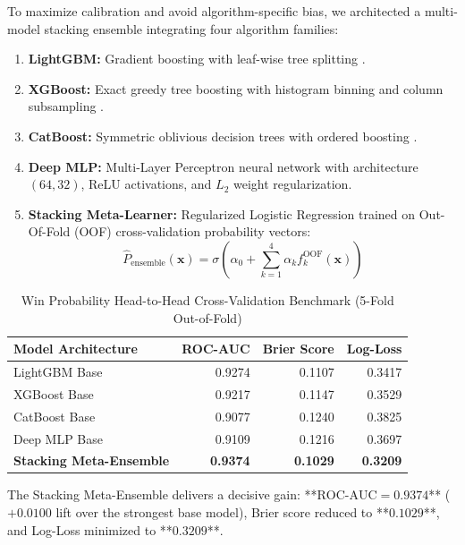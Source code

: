 \documentclass[11pt,a4paper]{article}
\begin{document}
To maximize calibration and avoid algorithm-specific bias, we architected a multi-model stacking ensemble integrating four algorithm families:
\begin{enumerate}[leftmargin=*,itemsep=2pt]
    \item \textbf{LightGBM:} Gradient boosting with leaf-wise tree splitting \cite{ke2017}.
    \item \textbf{XGBoost:} Exact greedy tree boosting with histogram binning and column subsampling \cite{chen2016}.
    \item \textbf{CatBoost:} Symmetric oblivious decision trees with ordered boosting \cite{prokhorenkova2018}.
    \item \textbf{Deep MLP:} Multi-Layer Perceptron neural network with architecture $(64, 32)$, ReLU activations, and $L_2$ weight regularization.
    \item \textbf{Stacking Meta-Learner:} Regularized Logistic Regression trained on Out-Of-Fold (OOF) cross-validation probability vectors:
    \begin{equation}
    \widehat{P}_{\text{ensemble}}(\mathbf{x}) = \sigma\left( \alpha_0 + \sum_{k=1}^4 \alpha_k f_k^{\text{OOF}}(\mathbf{x}) \right)
    \end{equation}
\end{enumerate}

\begin{table}[htbp]
\centering
\small
\caption{Win Probability Head-to-Head Cross-Validation Benchmark (5-Fold Out-of-Fold)}
\label{tab:ensemble_wp}
\begin{tabularx}{\linewidth}{l r r r}
\toprule
\textbf{Model Architecture} & \textbf{ROC-AUC} & \textbf{Brier Score} & \textbf{Log-Loss} \\
\midrule
LightGBM Base & 0.9274 & 0.1107 & 0.3417 \\
XGBoost Base & 0.9217 & 0.1147 & 0.3529 \\
CatBoost Base & 0.9077 & 0.1240 & 0.3825 \\
Deep MLP Base & 0.9109 & 0.1216 & 0.3697 \\
\midrule
\textbf{Stacking Meta-Ensemble} & \textbf{0.9374} & \textbf{0.1029} & \textbf{0.3209} \\
\bottomrule
\end{tabularx}
\end{table}

The Stacking Meta-Ensemble delivers a decisive gain: **$\text{ROC-AUC} = 0.9374$** ($+0.0100$ lift over the strongest base model), Brier score reduced to **$0.1029$**, and Log-Loss minimized to **$0.3209$**.
\end{document}
